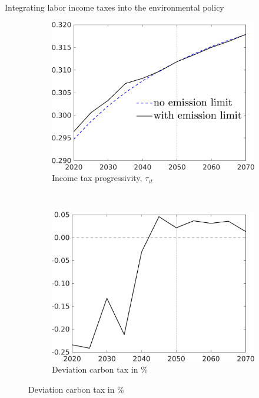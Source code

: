 \documentclass[11pt,aspectratio=169]{beamer}
\begin{document}
\begin{frame}{Integrating labor income taxes into the environmental policy}
	\vspace{-3mm}
	\centering
	\begin{figure}[h!!]
		\centering
		
		\begin{subfigure}{0.45\textwidth}		
			\caption{{Income tax progressivity, $\tau_{\iota t}$}}
			\includegraphics[width=1\textwidth]{../codding_model/own_basedOnFried/optimalPol_010922_revision/figures/all_13Sept22/NewCalib_pol_TvsNoT_taul_base_emnet1_Sun2_spillover0_knspil3_xgr0_nsk0_sep0_extern0_PV1_etaa0.79_lgd1.png}
		\end{subfigure}
	\pause
		\begin{minipage}[]{0.05\textwidth}
			\
		\end{minipage}
		\begin{subfigure}{0.45\textwidth}		
			\caption{{Deviation carbon tax in \%}}
			\includegraphics[width=1\textwidth]{../codding_model/own_basedOnFried/optimalPol_010922_revision/figures/all_13Sept22/NewCalib_polTaulFixedPer_T_Tauf_Sun2_emnet1_spillover0_knspil3_xgr0_nsk0_sep0_extern0_PV1_etaa0.79.png}

\end{subfigure}
\end{figure}
\end{frame}
\end{document}
